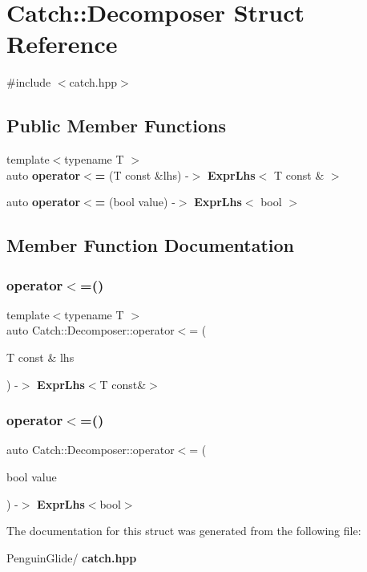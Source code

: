 \section{Catch\+::Decomposer Struct Reference}
\label{struct_catch_1_1_decomposer}


{\ttfamily \#include $<$catch.\+hpp$>$}

\subsection*{Public Member Functions}
\begin{DoxyCompactItemize}
\item 
{\footnotesize template$<$typename T $>$ }\\auto \textbf{ operator$<$=} (T const \&lhs) -\/$>$ \textbf{ Expr\+Lhs}$<$ T const \& $>$
\item 
auto \textbf{ operator$<$=} (bool value) -\/$>$ \textbf{ Expr\+Lhs}$<$ bool $>$
\end{DoxyCompactItemize}


\subsection{Member Function Documentation}
\mbox{\label{struct_catch_1_1_decomposer_a4b1e5e844c20e5a90e3d759d216674cd}} 
\subsubsection{operator$<$=()\hspace{0.1cm}{\footnotesize\ttfamily [1/2]}}
{\footnotesize\ttfamily template$<$typename T $>$ \\
auto Catch\+::\+Decomposer\+::operator$<$= (\begin{DoxyParamCaption}\item[{T const \&}]{lhs }\end{DoxyParamCaption}) -\/$>$ \textbf{ Expr\+Lhs}$<$T const\&$>$ \hspace{0.3cm}{\ttfamily [inline]}}

\mbox{\label{struct_catch_1_1_decomposer_aac129b94903ae1339d5709049d83613b}} 
\subsubsection{operator$<$=()\hspace{0.1cm}{\footnotesize\ttfamily [2/2]}}
{\footnotesize\ttfamily auto Catch\+::\+Decomposer\+::operator$<$= (\begin{DoxyParamCaption}\item[{bool}]{value }\end{DoxyParamCaption}) -\/$>$ \textbf{ Expr\+Lhs}$<$bool$>$ \hspace{0.3cm}{\ttfamily [inline]}}



The documentation for this struct was generated from the following file\+:\begin{DoxyCompactItemize}
\item 
Penguin\+Glide/\textbf{ catch.\+hpp}\end{DoxyCompactItemize}
